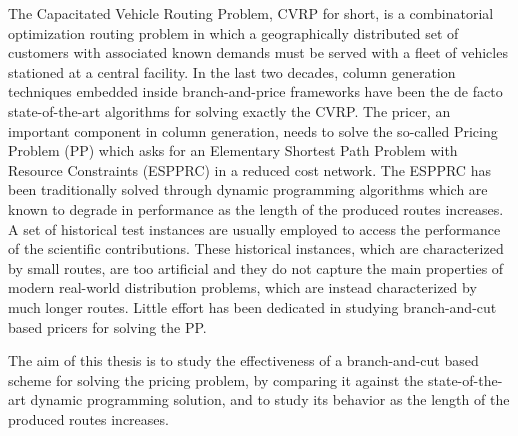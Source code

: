 \noindent The Capacitated Vehicle Routing Problem, CVRP for short,
is a combinatorial optimization routing problem in which
a geographically distributed set of
customers with associated known demands must be served with a fleet of vehicles
stationed at a central facility.
In the last two decades,
column generation techniques embedded inside branch-and-price frameworks
have been the de facto state-of-the-art algorithms
for solving exactly the CVRP.
The pricer, an important component in column generation, needs to solve
the so-called Pricing Problem (PP) which asks for an
Elementary Shortest Path Problem with Resource Constraints (ESPPRC)
in a reduced cost network.
The ESPPRC has been traditionally solved through dynamic programming
algorithms which are known to degrade in performance as
the length of the produced routes increases.
A set of historical test instances are usually employed to access
the performance of the scientific contributions.
These historical instances,
which are characterized by small routes,
are too artificial
and they do not capture the main properties of modern real-world distribution
problems,
which are instead characterized by much longer routes.
Little effort has been dedicated in studying branch-and-cut
based pricers for solving the PP.

\noindent The aim of this thesis is to study the effectiveness
of a branch-and-cut based scheme for solving the pricing problem,
by comparing it against the state-of-the-art dynamic programming solution,
and to study its behavior as the length of the produced routes increases.
